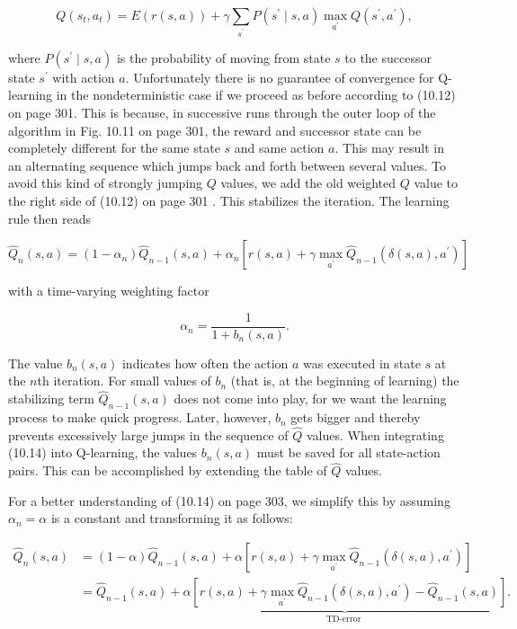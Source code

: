 \documentclass[10pt]{book}
\begin{document}
\begin{equation*}
Q\left(s_{t}, a_{t}\right)=E(r(s, a))+\gamma \sum_{s^{\prime}} P\left(s^{\prime} \mid s, a\right) \max _{a^{\prime}} Q\left(s^{\prime}, a^{\prime}\right), \tag{10.13}
\end{equation*}


where $P\left(s^{\prime} \mid s, a\right)$ is the probability of moving from state $s$ to the successor state $s^{\prime}$ with action $a$. Unfortunately there is no guarantee of convergence for Q-learning in the nondeterministic case if we proceed as before according to (10.12) on page 301. This is because, in successive runs through the outer loop of the algorithm in Fig. 10.11 on page 301, the reward and successor state can be completely different for the same state $s$ and same action $a$. This may result in an alternating sequence which jumps back and forth between several values. To avoid this kind of strongly jumping $Q$ values, we add the old weighted $Q$ value to the right side of (10.12) on page 301 . This stabilizes the iteration. The learning rule then reads


\begin{equation*}
\hat{Q}_{n}(s, a)=\left(1-\alpha_{n}\right) \hat{Q}_{n-1}(s, a)+\alpha_{n}\left[r(s, a)+\gamma \max _{a^{\prime}} \hat{Q}_{n-1}\left(\delta(s, a), a^{\prime}\right)\right] \tag{10.14}
\end{equation*}


with a time-varying weighting factor

$$
\alpha_{n}=\frac{1}{1+b_{n}(s, a)} .
$$

The value $b_{n}(s, a)$ indicates how often the action $a$ was executed in state $s$ at the $n$th iteration. For small values of $b_{n}$ (that is, at the beginning of learning) the stabilizing term $\hat{Q}_{n-1}(s, a)$ does not come into play, for we want the learning process to make quick progress. Later, however, $b_{n}$ gets bigger and thereby prevents excessively large jumps in the sequence of $\hat{Q}$ values. When integrating (10.14) into Q-learning, the values $b_{n}(s, a)$ must be saved for all state-action pairs. This can be accomplished by extending the table of $\hat{Q}$ values.

For a better understanding of (10.14) on page 303, we simplify this by assuming $\alpha_{n}=\alpha$ is a constant and transforming it as follows:


$$
\begin{aligned}
\hat{Q}_{n}(s, a) & =(1-\alpha) \hat{Q}_{n-1}(s, a)+\alpha\left[r(s, a)+\gamma \max _{a^{\prime}} \hat{Q}_{n-1}\left(\delta(s, a), a^{\prime}\right)\right] \\
& =\hat{Q}_{n-1}(s, a)+\underbrace{\alpha\left[r(s, a)+\gamma \max _{a^{\prime}} \hat{Q}_{n-1}\left(\delta(s, a), a^{\prime}\right)-\hat{Q}_{n-1}(s, a)\right]}_{\text {TD-error }} .
\end{aligned}
$$
\end{document}
